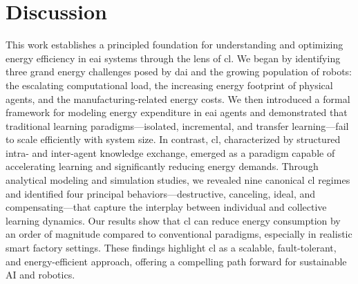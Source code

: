 \documentclass[12pt]{article}
\begin{document}
\section*{Discussion}\label{sec:discussion}

This work establishes a principled foundation for understanding and optimizing energy efficiency in \ac{eai} systems through the lens of \ac{cl}. We began by identifying three grand energy challenges posed by \ac{dai} and the growing population of robots: the escalating computational load, the increasing energy footprint of physical agents, and the manufacturing-related energy costs. We then introduced a formal framework for modeling energy expenditure in \ac{eai} agents and demonstrated that traditional learning paradigms---isolated, incremental, and transfer learning---fail to scale efficiently with system size. In contrast, \acl{cl}, characterized by structured intra- and inter-agent knowledge exchange, emerged as a paradigm capable of accelerating learning and significantly reducing energy demands. Through analytical modeling and simulation studies, we revealed nine canonical \ac{cl} regimes and identified four principal behaviors---destructive, canceling, ideal, and compensating---that capture the interplay between individual and collective learning dynamics. Our results show that \ac{cl} can reduce energy consumption by an order of magnitude compared to conventional paradigms, especially in realistic smart factory settings. These findings highlight \ac{cl} as a scalable, fault-tolerant, and energy-efficient approach, offering a compelling path forward for sustainable AI and robotics.

\end{document}

